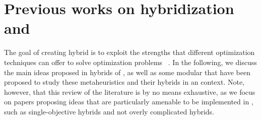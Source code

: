 \section{Previous works on hybridization and \ad}
\label{sec:Previous works on hybridization}
The goal of creating hybrid \mhs is to exploit the strengths that different optimization techniques can offer to solve optimization problems%
~\cite{GroAbr07:hea,Tal2013hm,BluRai2016:book,StuLop2019hb,CalArmMas2017:Learnheuristics}.
In the following, we discuss the main ideas proposed in hybrids of \algInPaper, as well as some modular \msfs that have been proposed to study these metaheuristics and their hybrids in an \ad context.
Note, however, that this review of the literature is by no means exhaustive, as we focus on papers proposing ideas that are particularly amenable to be implemented in \MetafoR, such as single-objective hybrids and not overly complicated hybrids.

